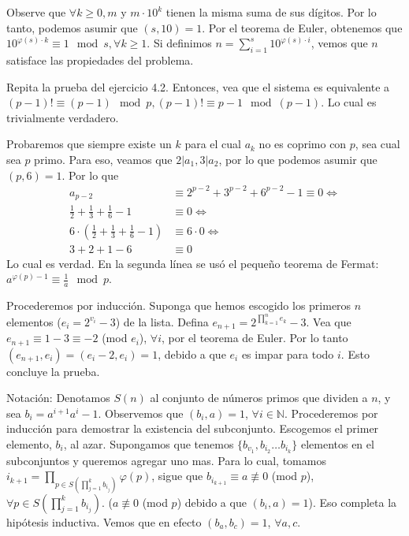 \begin{sol}
	Observe que $\forall k \geq 0, m $ y $ m\cdot 10^{k}$ tienen la misma suma de sus d\'igitos. Por lo tanto, podemos asumir que $(s, 10) = 1$. Por el teorema de Euler, obtenemos que $10^{\varphi(s)\cdot k } \equiv 1 \mod s, \forall k \geq 1$. Si definimos $n = \sum_{i=1}^{s} 10^{\varphi(s) \cdot i}$, vemos que $n$ satisface las propiedades del problema.
\end{sol}

\begin{sol}
	Repita la prueba del ejercicio 4.2. Entonces, vea que el sistema es equivalente a $(p-1)! \equiv (p-1) \mod p, (p-1)! \equiv p-1 \mod (p-1)$. Lo cual es trivialmente verdadero.
\end{sol}

\begin{sol}
	Probaremos que siempre existe un $k$ para el cual $a_{k}$ no es coprimo con $p$, sea cual sea $p$ primo. Para eso, veamos que $2|a_{1}, 3|a_{2}$, por lo que podemos asumir que $(p, 6) = 1$. Por lo que 
	\begin{align}
	a_{p-2} &\equiv 2^{p-2} + 3^{p-2} + 6^{p-2} -1 \equiv 0 \iff \\
	\frac{1}{2}+\frac{1}{3}+\frac{1}{6}-1 &\equiv 0 \iff \\
	6 \cdot ( \frac{1}{2}+\frac{1}{3}+\frac{1}{6}-1) &\equiv 6 \cdot 0 \iff \\
	3 + 2 + 1 - 6 &\equiv 0
	\end{align}
	Lo cual es verdad. En la segunda l\'inea se us\'o el pequeño teorema de Fermat: $a^{\varphi(p)-1} \equiv \frac{1}{a} \mod p$.
\end{sol}

\begin{sol}
	Procederemos por inducci\'on. Suponga que hemos escogido los primeros $n$ elementos ($e_{i} = 2 ^{v_{i}} - 3$) de la lista. Defina $e_{n+1} = 2^{\prod_{k = 1}^{n}e_{k}}-3$. Vea que $e_{n+1} \equiv 1-3 \equiv -2$ (mod $e_{i}$), $\forall i$, por el teorema de Euler. Por lo tanto $(e_{n+1}, e_{i}) = (e_{i}-2, e_{i}) = 1$, debido a que $e_{i}$ es impar para todo $i$. Esto concluye la prueba. 
\end{sol}

\begin{sol}
	Notaci\'on: Denotamos $S(n)$ al conjunto de n\'umeros primos que dividen a $n$, y sea $b_{i} = a^{i+1} a^{i} - 1$. Observemos que $(b_{i}, a) = 1$, $\forall i \in \mathbb{N}$. Procederemos por inducci\'on para demostrar la existencia del subconjunto. Escogemos el primer elemento, $b_{i}$, al azar. Supongamos que tenemos $\{b_{v_{1}}, b_{i_{2}} \dots b_{i_{k}} \}$ elementos en el subconjuntos y queremos agregar uno mas. Para lo cual, tomamos $i_{k+1} = \prod_{p\in S(\prod_{j = 1}^{k}b_{i_{j}})}\varphi(p)$, sigue que $b_{i_{k+1}} \equiv a \not\equiv 0$ (mod $p$), $\forall p \in S(\prod_{j = 1}^{k}b_{i_{j}})$. ($a \not\equiv 0$ (mod $p$) debido a que $(b_{i}, a) = 1$). Eso completa la hip\'otesis inductiva. Vemos que en efecto $(b_{a}, b_{c}) = 1$, $\forall a, c$.
\end{sol}

